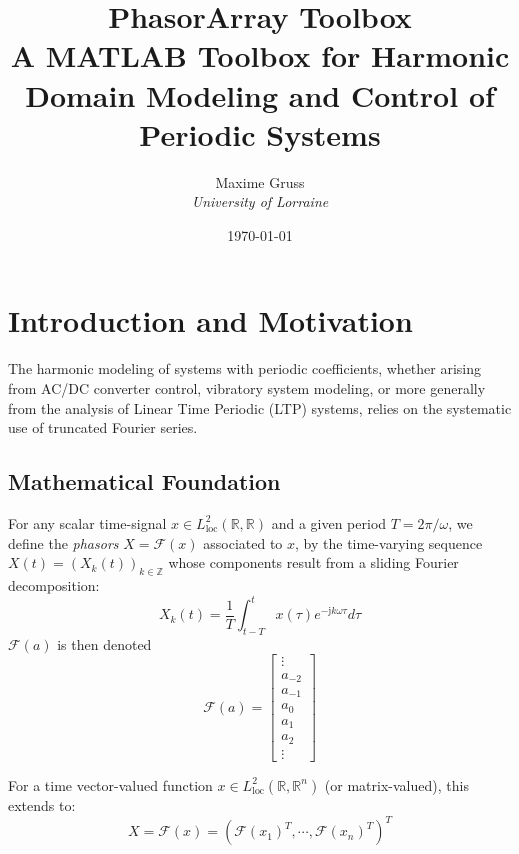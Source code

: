 \documentclass[11pt,a4paper]{article}
\title{\textbf{PhasorArray Toolbox}\\ 
\large A MATLAB Toolbox for Harmonic Domain Modeling and Control of Periodic Systems}
\author{Maxime Gruss\\
\textit{University of Lorraine}}
\date{\today}
\begin{document}
\maketitle

\tableofcontents
\clearpage

\section{Introduction and Motivation}

The harmonic modeling of systems with periodic coefficients, whether arising from AC/DC converter control, vibratory system modeling, or more generally from the analysis of Linear Time Periodic (LTP) systems, relies on the systematic use of truncated Fourier series.

\subsection{Mathematical Foundation}

For any scalar time-signal $x \in L^2_{\text{loc}}(\mathbb{R}, \mathbb{R})$ and a given period $T = 2\pi/\omega$, we define the \textit{phasors} $X = \mathcal{F}(x)$ associated to $x$, by the time-varying sequence $X(t) = (X_k(t))_{k \in \mathbb{Z}}$ whose components result from a sliding Fourier decomposition:
\begin{equation}
X_k(t) = \frac{1}{T}\int_{t-T}^{t} x(\tau)e^{-\mathrm{j}k\omega\tau} d\tau
\end{equation}
$\mathcal{F}(a)$ is then denoted 
\begin{equation}
    \mathcal{F}(a) = \begin{bmatrix}
    \vdots \\ 
    a_{-2} \\
    a_{-1} \\
    a_0 \\
    a_1 \\
    a_2 \\
    \vdots
    \end{bmatrix}
\end{equation}

For a time vector-valued function $x \in L^2_{\text{loc}}(\mathbb{R}, \mathbb{R}^n)$ (or matrix-valued), this extends to:
\begin{equation}
X = \mathcal{F}(x) = (\mathcal{F}(x_1)^T, \cdots, \mathcal{F}(x_n)^T)^T
\end{equation}
\end{document}
